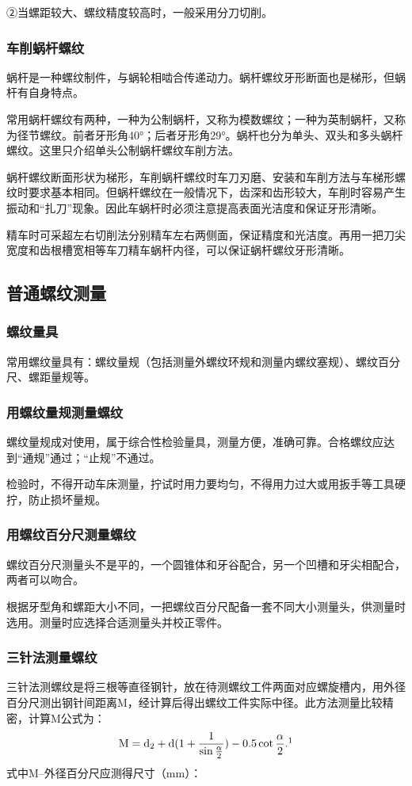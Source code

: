\documentclass{ctexbook}
\begin{document}
②当螺距较大、螺纹精度较高时，一般采用分刀切削。
\subsubsection{车削蜗杆螺纹}
蜗杆是一种螺纹制件，与蜗轮相啮合传递动力。蜗杆螺纹牙形断面也是梯形，但蜗杆有自身特点。

常用蜗杆螺纹有两种，一种为公制蜗杆，又称为模数螺纹；一种为英制蜗杆，又称为径节螺纹。前者牙形角40°；后者牙形角29°。蜗杆也分为单头、双头和多头蜗杆螺纹。这里只介绍单头公制蜗杆螺纹车削方法。

蜗杆螺纹断面形状为梯形，车削蜗杆螺纹时车刀刃磨、安装和车削方法与车梯形螺纹时要求基本相同。但蜗杆螺纹在一般情况下，齿深和齿形较大，车削时容易产生振动和“扎刀”现象。因此车蜗杆时必须注意提高表面光洁度和保证牙形清晰。

精车时可采超左右切削法分别精车左右两侧面，保证精度和光洁度。再用一把刀尖宽度和齿根槽宽相等车刀精车蜗杆内径，可以保证蜗杆螺纹牙形清晰。
\subsection{普通螺纹测量}
\subsubsection{螺纹量具}
常用螺纹量具有：螺纹量规（包括测量外螺纹环规和测量内螺纹塞规）、螺纹百分尺、螺距量规等。
\subsubsection{用螺纹量规测量螺纹}
螺纹量规成对使用，属于综合性检验量具，测量方便，准确可靠。合格螺纹应达到“通规”通过；“止规”不通过。

检验时，不得开动车床测量，拧试时用力要均匀，不得用力过大或用扳手等工具硬拧，防止损坏量规。
\subsubsection{用螺纹百分尺测量螺纹}
螺纹百分尺测量头不是平的，一个圆锥体和牙谷配合，另一个凹槽和牙尖相配合，两者可以吻合。

根据牙型角和螺距大小不同，一把螺纹百分尺配备一套不同大小测量头，供测量时选用。测量时应选择合适测量头并校正零件。
\subsubsection{三针法测量螺纹}
三针法测螺纹是将三根等直径钢针，放在待测螺纹工件两面对应螺旋槽内，用外径百分尺测出钢针间距离M，经计算后得出螺纹工件实际中径。此方法测量比较精密，计算M公式为：
\begin{equation*}
	\text{M}=\text{d$_{2}$}+\text{d}(1+\frac{1}{\sin\frac{\alpha}{2}})-0.5\cot\frac{\alpha}{2} .\footnotemark
\end{equation*}
式中M--外径百分尺应测得尺寸（mm）：
\end{document}
